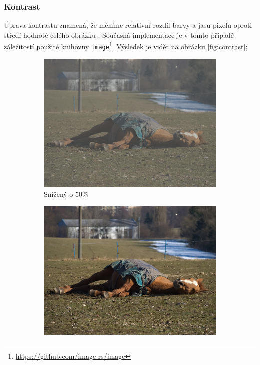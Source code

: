 \documentclass[11pt, a4paper, titlepage]{article}
\begin{document}
\subsubsection{Kontrast}
Úprava kontrastu znamená, že měníme relativní rozdíl barvy a jasu pixelu oproti středí hodnotě celého obrázku \cite{wiki:Contrast_vision}.
Současná implementace je v tomto případě záležitostí použité knihovny \texttt{image}\footnote{\url{https://github.com/image-rs/image}}.
Výsledek je vidět na obrázku \ref{fig:contrast};
\begin{figure}[h]
    \centering
    \begin{subfigure}[t]{0.25\textwidth}
        \vskip 0pt
        \includegraphics[width=1.0\textwidth]{horse_contrast_minus.jpg}
        \caption{Snížený o 50\%}
    \end{subfigure}
    \hspace{1cm}
    \begin{subfigure}[t]{0.25\textwidth}
        \vskip 0pt
        \includegraphics[width=1.0\textwidth]{horse_original.jpg}

\end{subfigure}
\end{figure}
\end{document}
